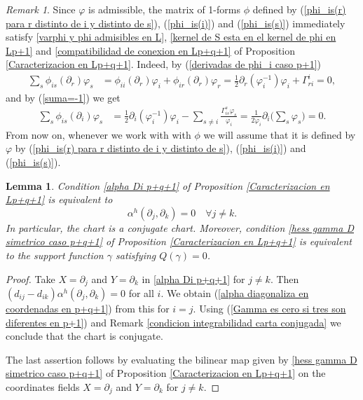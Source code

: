\documentclass{article}
\newtheorem{lema}[thm]{Lemma}
\theoremstyle{remark}
\newtheorem{remark}[thm]{Remark}
\begin{document}
\begin{remark}
    Since $\varphi$ is admissible, the matrix of 1-forms $\phi$ defined by (\ref{phi_is(r) para r distinto de i y distinto de s}), (\ref{phi_is(i)}) and (\ref{phi_is(s)}) immediately satisfy \ref{varphi y phi admisibles en L}, \ref{kernel de S esta en el kernel de phi en Lp+1} and \ref{compatibilidad de conexion en Lp+q+1} of Proposition \ref{Caracterizacion en Lp+q+1}. Indeed, by (\ref{derivadas de phi_i caso p+1})
    \begin{align*}
        \sum_s\phi_{is}(\partial_r)\varphi_s&=\phi_{ii}(\partial_r)\varphi_i+\phi_{ir}(\partial_r)\varphi_r=\frac{1}{2}\partial_r(\varphi^{-1}_i)\varphi_i+\Gamma_{ri}^i=0,
    \end{align*}
    and by (\ref{suma=-1}) we get
    \begin{align*}
        \sum_s\phi_{is}(\partial_i)\varphi_s&=\frac{1}{2}\partial_i(\varphi^{-1}_i)\varphi_i-\sum_{s\neq i}\frac{\Gamma_{is}^s\varphi_s}{\varphi_i}=\frac{1}{2\varphi_i}\partial_i\Big(\sum_s\varphi_s\Big)=0.
    \end{align*}
    From now on, whenever we work with with $\phi$ we will assume that it is defined by $\varphi$ by (\ref{phi_is(r) para r distinto de i y distinto de s}), (\ref{phi_is(i)}) and (\ref{phi_is(s)}).
\end{remark}
\begin{lema}\label{Condiciones en (h,gamma)}
    Condition \ref{alpha Di p+q+1} of Proposition \ref{Caracterizacion en Lp+q+1} is equivalent to
    \begin{equation}\label{alpha diagonaliza en coordenadas en p+q+1}
    \alpha^h(\partial_j,\partial_k)=0\quad\forall j\neq k.
\end{equation}
    In particular, the chart is a conjugate chart. Moreover, condition \ref{hess gamma D simetrico caso p+q+1} of Proposition \ref{Caracterizacion en Lp+q+1} is equivalent to the support function  $\gamma$ satisfying $Q(\gamma)=0$.
\end{lema}
\begin{proof}
    Take $X=\partial_j$ and $Y=\partial_k$ in \ref{alpha Di p+q+1} for $j\neq k$. Then $(d_{ij}-d_{ik})\alpha^h(\partial_j,\partial_k)=0$ for all $i$. We obtain (\ref{alpha diagonaliza en coordenadas en p+q+1}) from this for $i=j$. 
    Using (\ref{Gamma es cero si tres son diferentes en p+1}) and Remark \ref{condicion integrabilidad carta conjugada} we conclude that the chart is conjugate.
    
    The last assertion follows by evaluating the bilinear map given by \ref{hess gamma D simetrico caso p+q+1} of Proposition \ref{Caracterizacion en Lp+q+1} on the coordinates fields $X=\partial_j$ and $Y=\partial_k$ for $j\neq k$. 
\end{proof}
\end{document}
